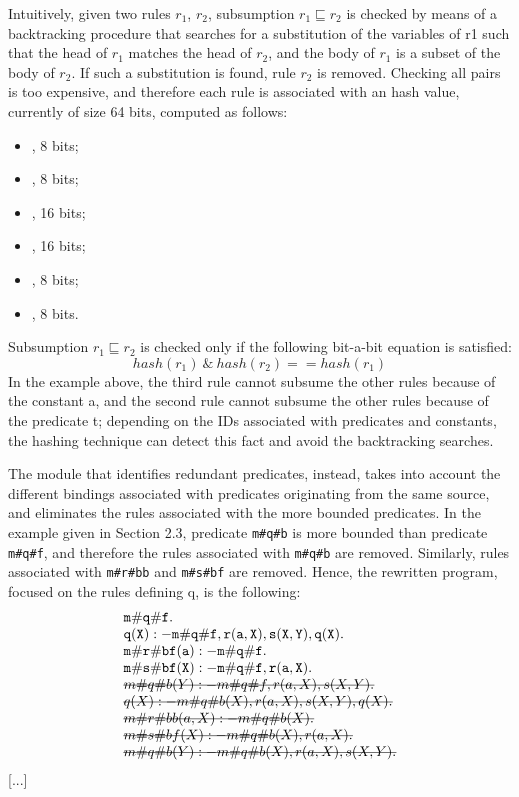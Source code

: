 \documentclass[oneside]{book}
\newcommand{\stkout}[1]{\ifmmode\text{\sout{\ensuremath{#1}}}\else\sout{#1}\fi}
\begin{document}
Intuitively, given two rules $r_1$, $r_2$, subsumption $r_1 \sqsubseteq r_2$ is checked by means of a backtracking procedure that searches for a substitution of the variables of r1 such that the head of $r_1$ matches the head of $r_2$, and the body of $r_1$ is a subset of the body of $r_2$. If such a substitution is found, rule  $r_2$ is removed. Checking all pairs is too expensive, and therefore each rule is associated with an hash value, currently of size 64 bits, computed as follows:
\begin{itemize}
\item <OR of IDs of head predicates>, 8 bits;
\item <OR of IDs of head constants>, 8 bits;
\item <OR of IDs of predicates in positive body>, 16 bits;
\item <OR of IDs of constants in positive body>, 16 bits;
\item <OR of IDs of predicates in negative body>, 8 bits;
\item <OR of IDs of constants in negative body>, 8 bits.
\end{itemize}
Subsumption $r_1 \sqsubseteq r_2$ is checked only if the following bit-a-bit equation is satisfied:
$$hash(r_1) \ \& \ hash(r_2) == hash(r_1)$$
In the example above, the third rule cannot subsume the other rules because of the constant a, and the second rule cannot subsume the other rules because of the predicate t; depending on the IDs associated with predicates and constants, the hashing technique can detect this fact and avoid the backtracking searches.

The module that identifies redundant predicates, instead, takes into account the different bindings associated with predicates originating from the same source, and eliminates the rules associated with the more bounded predicates. In the example given in Section 2.3, predicate {\tt m\#q\#b} is more bounded than predicate {\tt m\#q\#f}, and therefore the rules associated with {\tt m\#q\#b} are removed. Similarly, rules associated with {\tt m\#r\#bb} and {\tt m\#s\#bf} are removed. Hence, the rewritten program, focused on the rules defining q, is the following:
\[
\begin{array}{l}
	{\tt m\#q\#f.}\\
	{\tt q(X) :- m\#q\#f, r(a,X), s(X,Y), q(X).}\\
	{\tt m\#r\#bf(a) :- m\#q\#f.}\\
	{\tt m\#s\#bf(X) :- m\#q\#f, r(a,X).}\\
	\mathtt{\stkout{m\#q\#b(Y) :- m\#q\#f, r(a,X), s(X,Y).}}\\
	\mathtt{\stkout{q(X) :- m\#q\#b(X), r(a,X), s(X,Y), q(X).}}\\
	\mathtt{\stkout{m\#r\#bb(a,X) :- m\#q\#b(X).}}\\
	\mathtt{\stkout{m\#s\#bf(X) :- m\#q\#b(X), r(a,X).}}\\
	\mathtt{\stkout{m\#q\#b(Y) :- m\#q\#b(X), r(a,X), s(X,Y).}}\\
\end{array}
\]
[...]
\end{document}
